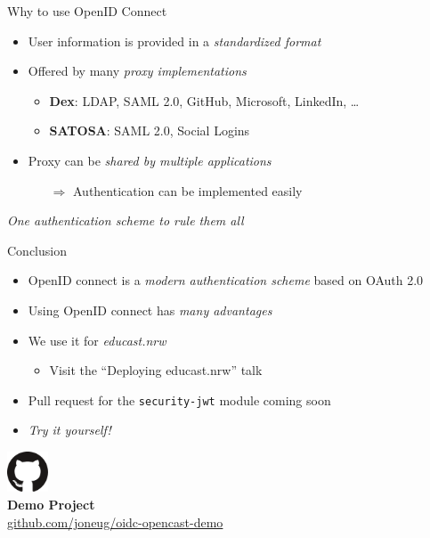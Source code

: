 \documentclass[aspectratio=169]{beamer}
\begin{document}
\begin{frame}{Why to use OpenID Connect}
	\begin{itemize}
		\item User information is provided in a \emph{standardized format}
		\pause
		\item Offered by many \emph{proxy implementations}
		\begin{itemize}
			\item \textbf{Dex}: LDAP, SAML 2.0, GitHub, Microsoft, LinkedIn, \dots
			\item \textbf{SATOSA}: SAML 2.0, Social Logins
		\end{itemize}
		\pause
		\item Proxy can be \emph{shared by multiple applications}
		\begin{itemize}
			\item[$\Rightarrow$] Authentication can be implemented easily 
		\end{itemize}
	\end{itemize}
	\vspace{3em}
	\pause
	\centering \emph{\large One authentication scheme to rule them all}
\end{frame}

\begin{frame}{Conclusion}
	\begin{itemize}
		\item OpenID connect is a \emph{modern authentication scheme} based on OAuth 2.0
		\pause
		\item Using OpenID connect has \emph{many advantages}
		\pause
		\item We use it for \emph{educast.nrw}
		\begin{itemize}
			\item Visit the \enquote{Deploying educast.nrw} talk 
		\end{itemize}
		\pause
		\item Pull request for the \texttt{security-jwt} module coming soon
		\pause
		\item \emph{Try it yourself!}
	\end{itemize}
	\vspace{0.5em}
	\centering
	\includegraphics[height=1.2cm]{figures/github-logo} \\
	\textbf{Demo Project} \\
	\href{http://github.com/joneug/oidc-opencast-demo}{github.com/joneug/oidc-opencast-demo}
\end{frame}
\end{document}
